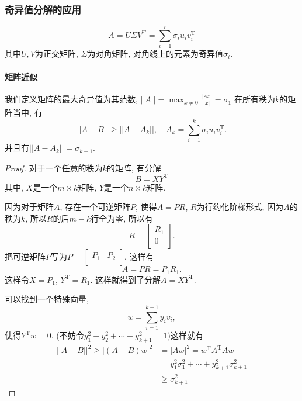 
\subsubsection{奇异值分解的应用}
\begin{equation}
  A = U \Sigma V^{\mathrm{T}} = \sum_{i=1}^r \sigma_i u_i v_i^{\mathrm{T}}
\end{equation}
其中$U, V$为正交矩阵, $\Sigma$为对角矩阵, 对角线上的元素为奇异值$\sigma_i$.

\paragraph{矩阵近似}
我们定义矩阵的最大奇异值为其范数, $||A|| = \displaystyle \max_{x\neq  0} \frac{|Ax|}{|x|} = \sigma_{1}$ 在所有秩为$k$的矩阵当中, 有
\begin{equation}
  ||A-B|| \ge  ||A - A_k||, \quad A_k = \sum_{i=1}^k \sigma_i u_i v_i^{\mathrm{T}}.
\end{equation}
并且有$||A - A_k || = \sigma_{k+1}$.
\begin{proof}
    对于一个任意的秩为$k$的矩阵, 有分解
    \begin{equation}
      B = X Y^{\mathrm{T}}
    \end{equation}
    其中, $X$是一个$ m \times k$矩阵, $Y$是一个$n \times k$矩阵. 

    因为对于矩阵$A$, 存在一个可逆矩阵$P$, 使得$A = PR$, $R$为行约化阶梯形式, 因为$A$的秩为$k$, 所以$R$的后$m-k$行全为零, 所以有
    \begin{equation}
      R = \begin{bmatrix}
       R_1\\
       0\\
      \end{bmatrix}.
    \end{equation}
    把可逆矩阵$P$写为$P = \begin{bmatrix}
     P_1 & P_2\\
    \end{bmatrix}$, 这样有
    \begin{equation}
      A = PR = P_1 R_1.
    \end{equation}
    这样令$X = P_1$, $Y^{\mathrm{T}} = R_1$. 这样就得到了分解$A = XY^{\mathrm{T}}$.

    可以找到一个特殊向量,
    \begin{equation}
      w = \sum_{i=1}^{k+1} y_i v_i,
    \end{equation}
    使得$Y^{\mathrm{T}}w = 0$. (不妨令$y_1^{2} + y_2^{2}+ \cdots +y_{k+1}^{2} = 1$)这样就有
    \begin{equation}
        \begin{aligned}
            ||A-B||^{2} \ge |(A-B)w|^{2} & = |Aw|^{2} =w^{\mathrm{T}}A^{\mathrm{T}}Aw\\
            & = y_{1}^{2} \sigma_1^{2} + \cdots + y_{k+1}^{2} \sigma_{k+1}^{2} \\
            &\ge  \sigma_{k+1}^{2}
        \end{aligned}
    \end{equation}
\end{proof}

